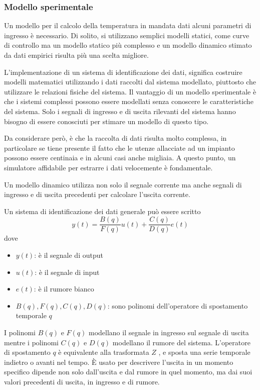 \documentclass[laurea,oneside,11pt]{USiena_tesiLM}
\begin{document}
\subsubsection{Modello sperimentale}
Un modello per il calcolo della temperatura in mandata dati alcuni parametri di ingresso è necessario.
Di solito, si utilizzano semplici modelli statici, come curve di controllo ma un modello statico più complesso e un modello dinamico stimato da dati empirici risulta più una scelta migliore.

L'implementazione di un  sistema di identificazione dei dati, significa costruire modelli matematici utilizzando i dati raccolti dal sistema modellato, piuttosto che utilizzare le relazioni fisiche del sistema. Il vantaggio di un modello sperimentale è che i sistemi complessi possono essere modellati senza conoscere le caratteristiche del sistema. Solo i segnali di ingresso e di uscita rilevanti del sistema hanno bisogno di essere conosciuti per stimare un modello di questo tipo.

Da considerare però, è che la raccolta di dati risulta molto complessa, in particolare se tiene presente il fatto che le utenze allacciate ad un impianto possono essere centinaia e in alcuni casi anche migliaia. A questo punto, un simulatore affidabile per estrarre i dati velocemente è fondamentale. 

Un modello dinamico utilizza non solo il segnale corrente ma anche segnali di ingresso e di uscita precedenti per calcolare l'uscita corrente.

Un sistema di identificazione dei dati generale può essere scritto
\begin{equation}
y(t) = \dfrac{B(q)}{F(q)} u(t) + \dfrac{C(q)}{D(q)} e(t)
\end{equation}
dove
\begin{itemize}
\item[] $y(t)$:  è il segnale di output
\item[] $u(t)$: è il segnale di input
\item[] $e(t)$: è il rumore bianco
\item[] $B(q), F(q), C(q), D(q)$: sono polinomi dell'operatore di  spostamento temporale $q$
\end{itemize}
I polinomi $B(q)$ e $F(q)$  modellano il segnale in ingresso sul segnale di uscita mentre i polinomi $C(q)$ e $D(q)$ modellano il rumore del sistema. L'operatore di spostamento $q$ è equivalente alla trasformata $Z$ , e sposta una serie temporale indietro o avanti nel tempo. È usato per descrivere  l'uscita in un momento specifico dipende non solo dall'uscita e dal rumore in quel momento, ma dai suoi valori precedenti di uscita, in ingresso e di rumore.
\end{document}
